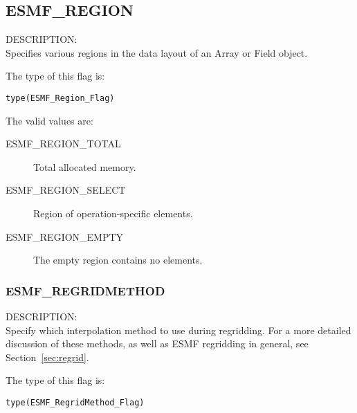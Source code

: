 \subsection{ESMF\_REGION}
\label{const:region}
{\sf DESCRIPTION:\\}
Specifies various regions in the data layout of an Array or Field object.

The type of this flag is:

{\tt type(ESMF\_Region\_Flag)}

The valid values are:
\begin{description}
\item [ESMF\_REGION\_TOTAL]
      Total allocated memory.
\item [ESMF\_REGION\_SELECT]
      Region of operation-specific elements.
\item [ESMF\_REGION\_EMPTY]
      The empty region contains no elements.
\end{description}


\subsubsection{ESMF\_REGRIDMETHOD}
\label{opt:regridmethod}

{\sf DESCRIPTION:\\}  
Specify which interpolation method to use during regridding. For a more detailed discussion of these methods, as well as ESMF regridding in general, see Section~\ref{sec:regrid}.

The type of this flag is:

{\tt type(ESMF\_RegridMethod\_Flag)}

